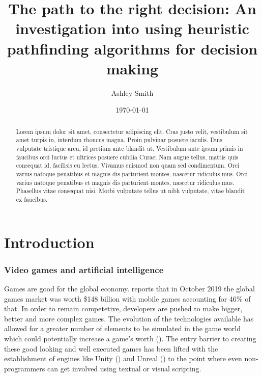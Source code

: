 \documentclass[11pt, a4paper]{article}
\begin{document}
\title{\titlefont The path to the right decision: An investigation into using heuristic pathfinding algorithms for decision making}
\author{Ashley Smith}
\date{\today}
\maketitle
\thispagestyle{empty}

\renewcommand\abstractname{\textbf{Abstract}}
\begin{abstract}
Lorem ipsum dolor sit amet, consectetur adipiscing elit. Cras justo velit, vestibulum sit amet turpis in, interdum rhoncus magna. Proin pulvinar posuere iaculis. Duis vulputate tristique arcu, id pretium ante blandit ut. Vestibulum ante ipsum primis in faucibus orci luctus et ultrices posuere cubilia Curae; Nam augue tellus, mattis quis consequat id, facilisis eu lectus. Vivamus euismod non quam sed condimentum. Orci varius natoque penatibus et magnis dis parturient montes, nascetur ridiculus mus. Orci varius natoque penatibus et magnis dis parturient montes, nascetur ridiculus mus. Phasellus vitae consequat nisi. Morbi vulputate tellus ut nibh vulputate, vitae blandit ex faucibus.
\end{abstract}

\cleardoublepage
\setcounter{page}{1}
\tableofcontents

\cleardoublepage
{}
\setcounter{page}{1}
\section{Introduction}

\subsubsection{Video games and artificial intelligence}

Games are good for the global economy. \citeauthor{Newzoo} reports that in October 2019 the global games market was worth \$148 billion with mobile games accounting for 46\% of that. In order to remain competetive, developers are pushed to make bigger, better and more complex games. The evolution of the technologies available has allowed for a greater number of elements to be simulated in the game world which could potentially increase a game's worth (\cite{blow2004game}). The entry barrier to creating these good looking and well executed games has been lifted with the establishment of engines like Unity (\cite{Unity}) and Unreal (\cite{Unreal}) to the point where even non-programmers can get involved using textual or visual scripting.
\end{document}
